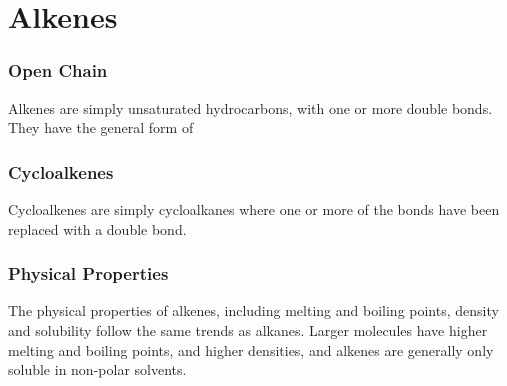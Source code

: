 

\pagebreak
\hypertarget{ChapterAlkenes}{}
\part{Alkenes}

	\section{Open Chain}

		Alkenes are simply unsaturated hydrocarbons, with one or more double bonds. They have the general form of



	\section{Cycloalkenes}

		Cycloalkenes are simply cycloalkanes where one or more of the  bonds have been replaced with a  double
		bond.



	\section{Physical Properties}

		The physical properties of alkenes, including melting and boiling points, density and solubility follow the
		same trends as alkanes. Larger molecules have higher melting and boiling points, and higher densities, and alkenes are
		generally only soluble in non-polar solvents.


	\pagebreak
